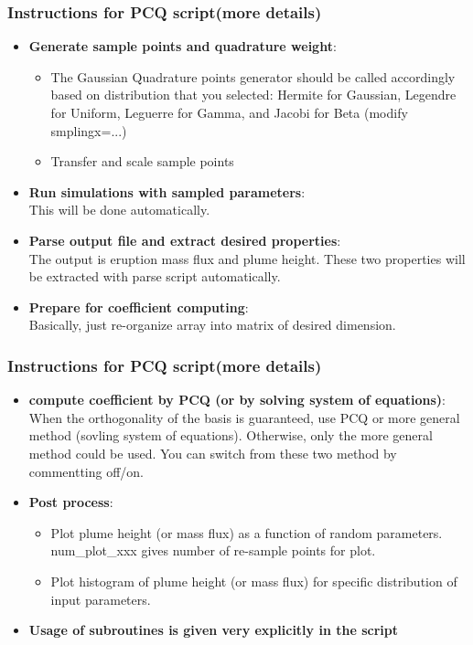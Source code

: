 \documentclass[10pt]{beamer}
\begin{document}
\begin{frame}
\frametitle{Instructions for PCQ script(more details)}
\begin{itemize}  
 \item {\bf Generate sample points and quadrature weight}:\\
   \begin{itemize}
    \item The Gaussian Quadrature points generator should be called accordingly based on distribution that you selected:
    Hermite for Gaussian, Legendre for Uniform, Leguerre for Gamma, and Jacobi for Beta (modify smplingx=...)
    \item Transfer and scale sample points
    \end{itemize}
 \item {\bf Run simulations with sampled parameters}:\\
 This will be done automatically. 
 \item {\bf Parse output file and extract desired properties}:\\
 The output is eruption mass flux and plume height. These two properties will be extracted with parse script automatically.
 \item {\bf Prepare for coefficient computing}:\\
 Basically, just re-organize array into matrix of desired dimension.
\end{itemize}
\end{frame}
 \begin{frame}
 \frametitle{Instructions for PCQ script(more details)}
 \begin{itemize}
 \item {\bf compute coefficient by PCQ (or by solving system of equations)}:\\
 When the orthogonality of the basis is guaranteed, use PCQ or more general method (sovling system of equations). Otherwise, only the more general method could be used. You can switch from these two method by commentting off/on.
 \item {\bf Post process}:\\ 
  \begin{itemize}
   \item Plot plume height (or mass flux) as a function of random parameters. num\_plot\_xxx gives number of re-sample points for plot.
   \item Plot histogram of plume height (or mass flux) for specific distribution of input parameters.  
 \end{itemize}
 \item {\bf Usage of subroutines is given very explicitly in the script} 
\end{itemize}
\end{frame}
\end{document}
